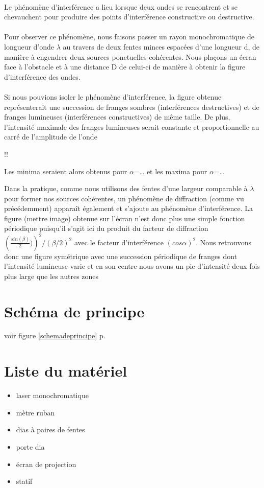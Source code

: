 \documentclass[11pt,a4paper]{report}
\begin{document}
\paragraph{}	
Le phénomène d'interférence a lieu lorsque deux ondes se rencontrent et se chevauchent pour produire des points d'interférence constructive ou destructive.
\paragraph{}
Pour observer ce phénomène, nous faisons passer un rayon monochromatique de longueur d'onde $\lambda$ au travers de deux fentes minces espacées d'une longueur d, de manière à engendrer deux sources ponctuelles cohérentes. Nous plaçons un écran face à l'obstacle et à une distance D de celui-ci de manière à obtenir la figure d'interférence des ondes. 
\paragraph{}
Si nous pouvions isoler le phénomène d'interférence, la figure obtenue représenterait une succession de franges sombres (interférences destructives) et de franges lumineuses (interférences constructives) de même taille. De plus, l'intensité maximale des franges lumineuses serait constante et proportionnelle au carré de l'amplitude de l'onde 

!!

Les minima seraient alors obtenus pour $\alpha$=… et les maxima pour $\alpha$=…

Dans la pratique, comme nous utilisons des fentes d'une largeur comparable à $\lambda$ pour former nos sources cohérentes, un phénomène de diffraction (comme vu précédemment) apparaît également et s'ajoute au phénomène d'interférence. La figure (mettre image) obtenue sur l'écran n'est donc plus une simple fonction périodique puisqu'il s'agit ici du produit du facteur de diffraction $\left(\frac{sin(\beta)}{2})\right)^{2}/(\beta/2)^2$ avec le facteur d'interférence $(cos\alpha)^{2}$. Nous retrouvons donc une figure symétrique avec une succession périodique de franges dont l’intensité lumineuse varie et en son centre nous avons un pic d'intensité deux fois plus large que les autres zones

	\section{Schéma de principe}
	voir figure \ref{schemadeprincipe} p.\pageref{schemadeprincipe}
	\section{Liste du matériel}
	\begin{itemize}
	\item laser monochromatique
	\item mètre ruban
	\item dias à paires de fentes
	\item porte dia
	\item écran de projection
	\item statif
	\end{itemize}
\end{document}
